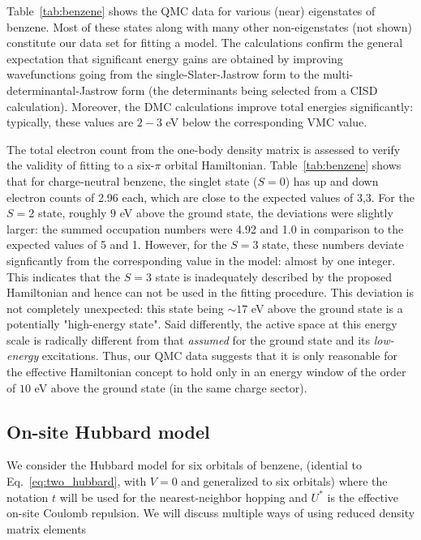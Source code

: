 \documentclass[aip,jcp,twocolumn,10pt]{revtex4-1}
\begin{document}
Table~\ref{tab:benzene} shows the QMC data for various (near) eigenstates of benzene. 
Most of these states along with many other non-eigenstates (not shown) 
constitute our data set for fitting a model. The calculations confirm 
the general expectation that significant energy gains are obtained by 
improving wavefunctions going from the single-Slater-Jastrow form to the 
multi-determinantal-Jastrow form (the determinants being selected 
from a CISD calculation). Moreover, the DMC calculations 
improve total energies significantly: typically, 
these values are $2-3$ eV below the corresponding VMC value.

The total electron count from the one-body density matrix is 
assessed to verify the validity of fitting to a six-$\pi$ orbital Hamiltonian. 
Table~\ref{tab:benzene} shows that for charge-neutral benzene, 
the singlet state ($S=0$) has up and down electron 
counts of 2.96 each, which are close to the expected values of 
3,3. For the $S=2$ state, roughly $9$ eV above the ground state, 
the deviations were slightly larger: the summed 
occupation numbers were 4.92 and 1.0 in comparison to the 
expected values of 5 and 1. However, for the $S=3$ state, these numbers deviate signficantly 
from the corresponding value in the model: 
almost by one integer. This indicates that the $S=3$ state is 
inadequately described by the proposed Hamiltonian and hence 
can not be used in the fitting procedure. 
This deviation is not completely unexpected: this state being 
$\sim 17$ eV above the ground state is a potentially "high-energy state". 
Said differently, the active space at this energy scale 
is radically different from that \emph{assumed} for the ground state and its 
\emph{low-energy} excitations.
Thus, our QMC data suggests that it is only reasonable for the effective 
Hamiltonian concept to hold only in an energy window of the order of $10 $ eV above the ground state 
(in the same charge sector).

\subsection {On-site Hubbard model}

We consider the Hubbard model for six orbitals of benzene, 
(idential to Eq.~\eqref{eq:two_hubbard}, with $V=0$ and generalized 
to six orbitals) where the notation $t$ will be used 
for the nearest-neighbor hopping and $U^{*}$ is the effective 
on-site Coulomb repulsion. 
We will discuss multiple ways of using reduced density matrix elements
\end{document}
